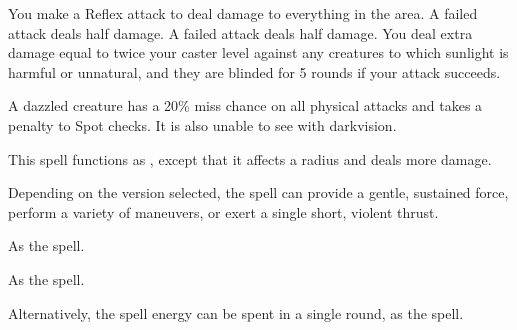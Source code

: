 \begin{spelleffect}
    You make a Reflex attack to deal damage to everything in the area. A failed attack deals half damage. A failed attack deals half damage. You deal extra damage equal to twice your caster level against any creatures to which sunlight is harmful or unnatural, and they are blinded for 5 rounds if your attack succeeds.
\end{spelleffect}
\begin{spellnotes}
  A dazzled creature has a 20\% miss chance on all physical attacks and takes a  penalty to Spot checks. It is also unable to see with darkvision. 
\end{spellnotes}

\spellrng{\rngmed}
\begin{spelleffect}
  This spell functions as , except that it affects a \areamed radius and deals more damage.
\end{spelleffect}

\begin{comment}
\subsubsection{T}
\end{comment}

\spellrng{\rngmed}
\begin{spelleffect}
  Depending on the version selected, the spell can provide a gentle, sustained force, perform a variety of maneuvers, or exert a single short, violent thrust.
  \par {} As the  spell.

  \par {} As the  spell.

  \par {} Alternatively, the spell energy can be spent in a single round, as the  spell.
\end{spelleffect}

